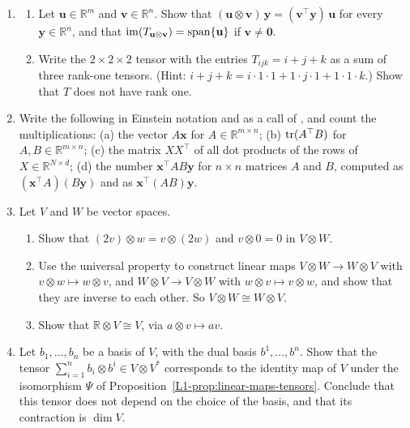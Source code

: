 \begin{enumerate}[leftmargin=*]
\begin{enumerate}
		\item Let $P$ be invertible. Show that the matrix $P^\top AP$ of $\beta$ in the basis of the columns of $P$ is symmetric if $A$ is, and that $\det(P^\top AP) = \det(P)^2\det(A)$. So the sign of the determinant of the matrix of a bilinear form does not depend on the basis, but its value does.
	\end{enumerate}
	\item \homework{} \begin{enumerate}
		\item Let $\mathbf{u} \in \mathbb{R}^m$ and $\mathbf{v} \in \mathbb{R}^n$. Show that $(\mathbf{u} \otimes \mathbf{v})\,\mathbf{y} = (\mathbf{v}^\top \mathbf{y})\,\mathbf{u}$ for every $\mathbf{y} \in \mathbb{R}^n$, and that $\operatorname{im}(T_{\mathbf{u} \otimes \mathbf{v}}) = \operatorname{span}\{\mathbf{u}\}$ if $\mathbf{v} \neq \mathbf{0}$.
		\item Write the $2 \times 2 \times 2$ tensor with the entries $T_{ijk} = i + j + k$ as a sum of three rank-one tensors. (Hint: $i + j + k = i \cdot 1 \cdot 1 + 1 \cdot j \cdot 1 + 1 \cdot 1 \cdot k$.) Show that $T$ does not have rank one.
	\end{enumerate}
	\item \homework{} Write the following in Einstein notation and as a call of , and count the multiplications: (a) the vector $A\mathbf{x}$ for $A \in \mathbb{R}^{m \times n}$; (b) $\operatorname{tr}(A^\top B)$ for $A, B \in \mathbb{R}^{m \times n}$; (c) the matrix $XX^\top$ of all dot products of the rows of $X \in \mathbb{R}^{N \times d}$; (d) the number $\mathbf{x}^\top AB\mathbf{y}$ for $n \times n$ matrices $A$ and $B$, computed as $(\mathbf{x}^\top A)(B\mathbf{y})$ and as $\mathbf{x}^\top (AB)\mathbf{y}$.
	\item Let $V$ and $W$ be vector spaces.
	\begin{enumerate}
		\item Show that $(2v) \otimes w = v \otimes (2w)$ and $v \otimes 0 = 0$ in $V \otimes W$.
		\item Use the universal property to construct linear maps $V \otimes W \to W \otimes V$ with $v \otimes w \mapsto w \otimes v$, and $W \otimes V \to V \otimes W$ with $w \otimes v \mapsto v \otimes w$, and show that they are inverse to each other. So $V \otimes W \cong W \otimes V$.
		\item Show that $\mathbb{R} \otimes V \cong V$, via $a \otimes v \mapsto av$.
	\end{enumerate}
	\item \homework{} Let $b_1, \ldots, b_n$ be a basis of $V$, with the dual basis $b^1, \ldots, b^n$. Show that the tensor $\sum_{i=1}^n b_i \otimes b^i \in V \otimes V^*$ corresponds to the identity map of $V$ under the isomorphism $\Psi$ of Proposition~\ref{L1-prop:linear-maps-tensors}. Conclude that this tensor does not depend on the choice of the basis, and that its contraction is $\dim V$.
\end{enumerate}

